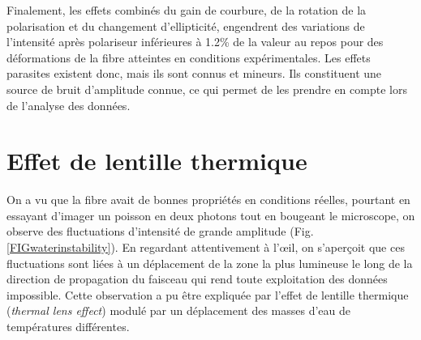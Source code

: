 Finalement, les effets combinés du gain de courbure, de la rotation de la polarisation et du changement d'ellipticité, engendrent des variations de l'intensité après polariseur inférieures à 1.2\% de la valeur au repos pour des déformations de la fibre atteintes en conditions expérimentales. Les effets parasites existent donc, mais ils sont connus et mineurs. Ils constituent une source de bruit d'amplitude connue, ce qui permet de les prendre en compte lors de l'analyse des données.



\section{Effet de lentille thermique}\label{sectionthermallenseffect}


On a vu que la fibre avait de bonnes propriétés en conditions réelles, pourtant en essayant d'imager un poisson en deux photons tout en bougeant le microscope, on observe des fluctuations d'intensité de grande amplitude (Fig. \ref{FIGwaterinstability}). En regardant attentivement à l'œil, on s'aperçoit que ces fluctuations sont liées à un déplacement de la zone la plus lumineuse le long de la direction de propagation du faisceau qui rend toute exploitation des données impossible. Cette observation a pu être expliquée par l'effet de lentille thermique (\emph{thermal lens effect}) modulé par un déplacement des masses d'eau de températures différentes.

